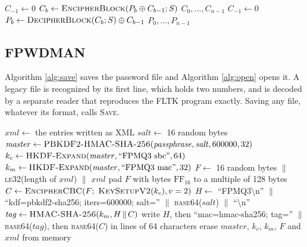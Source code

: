 \begin{algorithm}[htbp]
\caption{Chaining blocks (CBC with a zero starting value)}
\label{alg:cbc}
\begin{algorithmic}[1]
  \State $C_{-1} \gets 0$
    \State $C_b \gets \textsc{EncipherBlock}(P_b \oplus C_{b-1}; S)$
  \EndFor
  \State \Return $C_0, \ldots, C_{n-1}$
\EndFunction
{}
  \State $C_{-1} \gets 0$
    \State $P_b \gets \textsc{DecipherBlock}(C_b; S) \oplus C_{b-1}$
  \EndFor
  \State \Return $P_0, \ldots, P_{n-1}$
\EndFunction
\end{algorithmic}
\end{algorithm}

\subsection{FPWDMAN}

Algorithm \ref{alg:save} saves the password file and Algorithm \ref{alg:open}
opens it. A legacy file is recognized by its first line, which holds two
numbers, and is decoded by a separate reader that reproduces the FLTK program
exactly. Saving any file, whatever its format, calls \textsc{Save}.

\begin{algorithm}[htbp]
\caption{Saving the password file (FPMQ3)}
\label{alg:save}
\begin{algorithmic}[1]
  \State $\mathit{xml} \gets$ the entries written as XML
  \State $\mathit{salt} \gets$ 16 random bytes
  \State $\mathit{master} \gets \textsc{PBKDF2-HMAC-SHA-256}(\mathit{passphrase}, \mathit{salt}, 600000, 32)$
  \State $k_c \gets \textsc{HKDF-Expand}(\mathit{master}, \text{``FPMQ3 sbc''}, 64)$
  \State $k_m \gets \textsc{HKDF-Expand}(\mathit{master}, \text{``FPMQ3 mac''}, 32)$
  \State $F \gets$ 16 random bytes $\|$ \textsc{le32}(length of $\mathit{xml}$) $\|$ $\mathit{xml}$
  \State pad $F$ with bytes $\mathrm{FF}_{16}$ to a multiple of 128 bytes
  \State $C \gets \textsc{EncipherCBC}(F;\ \textsc{KeySetupV2}(k_c), v = 2)$
  \State $H \gets$ ``FPMQ3\textbackslash n'' $\|$
         ``kdf=pbkdf2-sha256; iters=600000; salt='' $\|$ \textsc{base64}($\mathit{salt}$) $\|$ ``\textbackslash n''
  \State $\mathit{tag} \gets \textsc{HMAC-SHA-256}(k_m, H \,\|\, C)$
  \State write $H$, then ``mac=hmac-sha256; tag='' $\|$ \textsc{base64}($\mathit{tag}$),
         then \textsc{base64}($C$) in lines of 64 characters
  \State erase $\mathit{master}$, $k_c$, $k_m$, $F$ and $\mathit{xml}$ from memory
\EndFunction
\end{algorithmic}
\end{algorithm}


